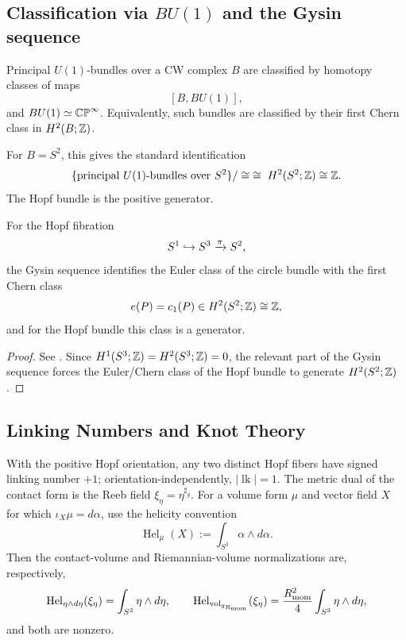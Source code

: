 \documentclass[11pt]{article}
\begin{document}
\subsection{Classification via \texorpdfstring{\(BU(1)\)}{BU(1)} and the Gysin sequence}
\label{p1:der:quantization}

Principal \(U(1)\)-bundles over a CW complex \(B\) are classified by homotopy
classes of maps
\[
[B,BU(1)],
\]
and \(BU(1)\simeq \mathbb{CP}^\infty\). Equivalently, such bundles are classified by their
first Chern class in \(H^2(B;\mathbb{Z})\).

For \(B=S^2\), this gives the standard identification
\[
\{\text{principal }U(1)\text{-bundles over }S^2\}/\cong
\;\cong\;
H^2(S^2;\mathbb{Z})\cong \mathbb{Z}.
\]
The Hopf bundle is the positive generator.

\begin{theorem}
\label{p1:thm:gysin-hopf-bundle}
For the Hopf fibration
\[
S^1 \hookrightarrow S^3 \xrightarrow{\pi} S^2,
\]
the Gysin sequence identifies the Euler class of the circle bundle with the first
Chern class
\[
e(P)=c_1(P)\in H^2(S^2;\mathbb{Z})\cong \mathbb{Z},
\]
and for the Hopf bundle this class is a generator.
\end{theorem}

\begin{proof}
See \cite{bott1982differential,steenrod1951topology}. Since \(H^1(S^3;\mathbb{Z})=
H^2(S^3;\mathbb{Z})=0\), the relevant part of the Gysin sequence forces the Euler/Chern
class of the Hopf bundle to generate \(H^2(S^2;\mathbb{Z})\).
\end{proof}


\subsection{Linking Numbers and Knot Theory}
\label{p1:der:linking}
\begin{proposition}
\label{p1:prop:hopf-linking-helicity}
With the positive Hopf orientation, any two distinct Hopf fibers have signed
linking number \(+1\); orientation-independently,
\(|\operatorname{lk}|=1\).  The metric dual of the contact form is the Reeb
field \(\xi_\eta=\eta^{\sharp_g}\).  For a volume form \(\mu\) and vector field
\(X\) for which \(\iota_X\mu=d\alpha\), use the helicity convention
\[
    \operatorname{Hel}_{\mu}(X):=\int_{S^3}\alpha\wedge d\alpha.
\]
Then the contact-volume and Riemannian-volume normalizations are, respectively,
\[
    \operatorname{Hel}_{\eta\wedge d\eta}(\xi_\eta)
    =\int_{S^3}\eta\wedge d\eta,
    \qquad
    \operatorname{Hel}_{\operatorname{vol}_{g_{R_{\mathrm{mom}}}}}(\xi_\eta)
    =\frac{R_{\mathrm{mom}}^2}{4}\int_{S^3}\eta\wedge d\eta,
\]
and both are nonzero.
\end{proposition}
\end{document}
